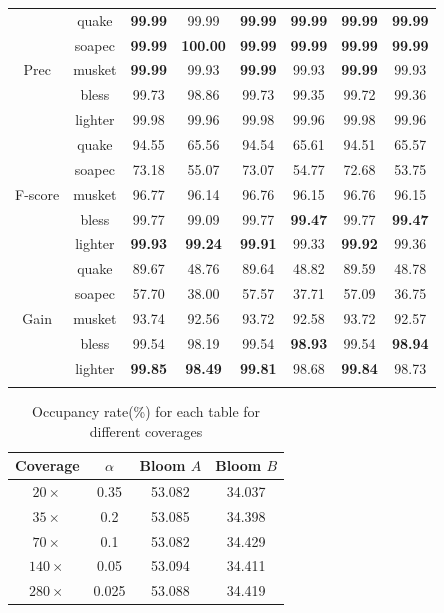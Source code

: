 \documentclass{bmcart}
\begin{document}
\begin{backmatter}
\begin{table}[h!]
\begin{tabular}{|c|c|c|c|c|c|c|c|}
		&	quake&	\textbf{99.99}&	99.99 &	\textbf{99.99}&	\textbf{99.99}&	\textbf{99.99}&	\textbf{99.99}\\ \cline{2-8}
		&  soapec& \textbf{99.99}	&	\textbf{100.00}	&	\textbf{99.99}	& \textbf{99.99}	& \textbf{99.99}	& \textbf{99.99} \\ \cline{2-8}
Prec	&	musket&	\textbf{99.99}&	99.93&	\textbf{99.99}&	99.93&	\textbf{99.99}&	99.93	\\ \cline{2-8}
		&	bless&	99.73&	98.86&	99.73&	99.35&	99.72&	99.36	\\ \cline{2-8}
		&	lighter&	99.98&	99.96&	99.98&	99.96&	99.98&	99.96\\ \hhline{|=|=|=|=|=|=|=|=|}
		
		&	quake&	94.55&	65.56&	94.54&	65.61&	94.51&	65.57	\\ \cline{2-8}
		& soapec & 73.18 &	55.07 &	73.07 &	54.77&	72.68&	53.75   \\ \cline{2-8}
F-score	&	musket&	96.77&	96.14&	96.76&	96.15&	96.76&	96.15	\\ \cline{2-8}
		&	bless&	99.77&	99.09&	99.77&	\textbf{99.47}&	99.77&	\textbf{99.47}	\\ \cline{2-8}
		&	lighter&	\textbf{99.93}&	\textbf{99.24}&	\textbf{99.91}&	99.33&	\textbf{99.92}&	99.36\\ \hhline{|=|=|=|=|=|=|=|=|}
		
		&	quake&	89.67&	48.76&	89.64&	48.82&	89.59&	48.78	\\ \cline{2-8}
		& soapec&	57.70& 	38.00& 	57.57&	37.71&	57.09&	36.75 	\\ \cline{2-8}
Gain	&	musket&	93.74&	92.56&	93.72&	92.58&	93.72&	92.57	\\ \cline{2-8}
		&	bless&	99.54&	98.19&	99.54&	\textbf{98.93}&	99.54&	\textbf{98.94}	\\ \cline{2-8}
		&	lighter&\textbf{99.85}&	\textbf{98.49}&	\textbf{99.81}&	98.68&	\textbf{99.84}&	98.73	\\ \hhline{|=|=|=|=|=|=|=|=|}
\end{tabular}
\end{table}


\begin{table}[h!] %
\caption{Occupancy rate(\%) for each table for different coverages}
\begin{tabular}{|c|c|c|c|}\hline
Coverage & $\alpha$ & Bloom $A$ & Bloom $B$ \\ \hline
$20\times$	& 0.35 & 53.082 & 34.037 \\ \hline
$35\times$ & 0.2 & 53.085 &34.398\\ \hline
$70\times$ & 0.1 &53.082 & 34.429 \\ \hline
$140\times$ & 0.05 & 53.094 &34.411  \\ \hline
$280\times$ & 0.025 & 53.088 &34.419\\ \hline
\end{tabular}
\end{table}


\end{backmatter}
\end{document}
